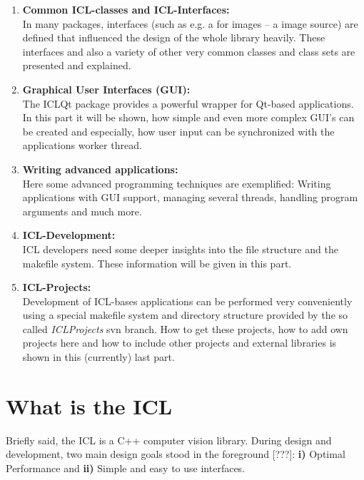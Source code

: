 \begin{enumerate}
\item \textbf{Common ICL-classes and ICL-Interfaces:}\\ In many packages, interfaces (such as e.g. a  for images -- a image source) are defined that influenced the design of the whole library heavily. These interfaces and also a variety of other very common classes and class sets are presented and explained.
\item \textbf{Graphical User Interfaces (GUI):}\\ The ICLQt package provides a powerful wrapper for Qt-based applications. In this part it will be shown, how simple and even more complex GUI's can be created and especially, how user input can be synchronized with the applications worker thread.
\item \textbf{Writing advanced applications:}\\ Here some advanced programming techniques are exemplified: Writing applications with GUI support, managing several threads, handling program arguments and much more.
\item \textbf{ICL-Development:}\\ICL developers need some deeper insights into the file structure and the makefile system. These information will be given in this part.
\item \textbf{ICL-Projects:}\\Development of ICL-bases applications can be performed very conveniently using a special makefile system and directory structure provided by the so called \emph{ICLProjects} svn branch. How to get these projects, how to add own projects here and how to include other projects and external libraries is shown in this (currently) last part. 
\end{enumerate} 

\section{What is the ICL}
Briefly said, the ICL is a C++ computer vision library. During design and development, two main design goals stood in the foreground [???]: \small{\textbf{i)}} Optimal Performance and \small{\textbf{ii)}} Simple and easy to use interfaces.

